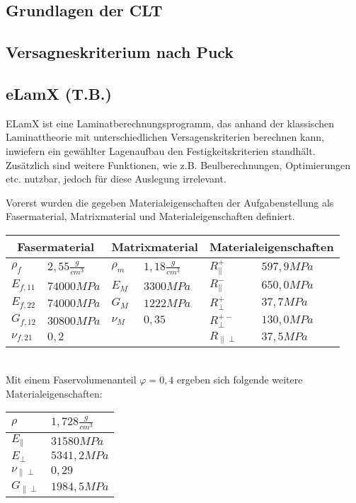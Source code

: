 \subsection{Grundlagen der CLT}
\subsection{Versagneskriterium nach Puck}
\subsection{eLamX (T.B.)}
ELamX ist eine Laminatberechnungsprogramm, das anhand der klassischen Laminattheorie mit unterschiedlichen Versagenskriterien berechnen kann, inwiefern ein gewählter Lagenaufbau den Festigkeitskriterien standhält. Zusätzlich sind weitere Funktionen, wie z.B. Beulberechnungen, Optimierungen etc. nutzbar, jedoch für diese Auslegung irrelevant.

\noindent Vorerst wurden die gegeben Materialeigenschaften der Aufgabenstellung als Fasermaterial, Matrixmaterial und  Materialeigenschaften definiert.\\

\begin{tabular}{ll|ll|ll}
	\multicolumn{2}{c}{Fasermaterial} &\multicolumn{2}{c}{Matrixmaterial}  &\multicolumn{2}{c}{Materialeigenschaften} \\
	\hline
	$\rho_{f}$ & $2,55 \frac{g}{cm^{3}}$  & $\rho_{m}$ & $1,18 \frac{g}{cm^{3}}$  & $R_{\parallel}^{+}$ & $597,9MPa$ \\
	\hline
	$E_{f,11}$ & $74000MPa$  & $E_{M}$ & $3300MPa$  & $R_{\parallel}^{-}$ & $650,0MPa$\\
	\hline
	$E_{f,22}$ & $74000MPa$  & $G_{M}$ & $1222MPa$  & $R_{\perp}^{+}$ & $37,7MPa$\\
	\hline
	$G_{f,12}$ & $30800MPa$ & $\nu_{M}$ & $0,35$  & $R_{\perp}^{+-}$ & $130,0MPa$\\
	\hline
	$\nu_{f,21}$ & $0,2$  & &   & $R_{\parallel\perp}$ & $37,5MPa$\\
\end{tabular}\\

\noindent Mit einem Faservolumenanteil $\varphi=0,4$ ergeben sich folgende weitere Materialeigenschaften:\\

\begin{tabular}{ll}
	$\rho$ & $1,728 \frac{g}{cm^{3}}$ \\
	\hline
	$E_{\parallel}$ & $31580 MPa$\\
	\hline
	$E_{\perp}$ & $5341,2MPa$\\
	\hline
	$\nu_{\parallel\perp}$ & $0,29$\\
	\hline
	$G_{\parallel\perp}$ & $1984,5 MPa$\\
\end{tabular}\\

